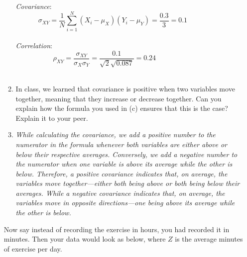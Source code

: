 \documentclass{./../handout}
\begin{document}
\begin{enumerate}
\begin{enumerate}
\textit{Covariance}:
$$ \sigma_{XY} = \frac{1}{N}\sum_{i=1}^N (X_i-\mu_X)(Y_i-\mu_Y) = \frac{0.3}{3} = 0.1  \hspace{2cm} $$ \\
\textit{Correlation}:
$$ \rho_{XY} = \frac{ \sigma_{XY}}{\sigma_X \sigma_Y}  = \frac{0.1}{\sqrt{2} \sqrt{0.087}}=0.24 \hspace{3cm} $$ \\
\item In class, we learned that covariance is positive when two variables move together, meaning that they increase or decrease together. Can you explain how the formula you used in (c) ensures that this is the case? Explain it to your peer.
\item[] \textit{While calculating the covariance, we add a positive number to the numerator in the formula whenever both variables are either above or below their respective averages. Conversely, we add a negative number to the numerator when one variable is above its average while the other is below. Therefore, a positive covariance indicates that, on average, the variables move together—either both being above or both being below their averages. While a negative covariance indicates that, on average, the variables move in opposite directions—one being above its average while the other is below.}
\end{enumerate}

Now say instead of recording the exercise in hours, you had recorded it in minutes. Then your data would look as below, where $Z$ is the average minutes of exercise per day. \\


\end{enumerate}
\end{document}
